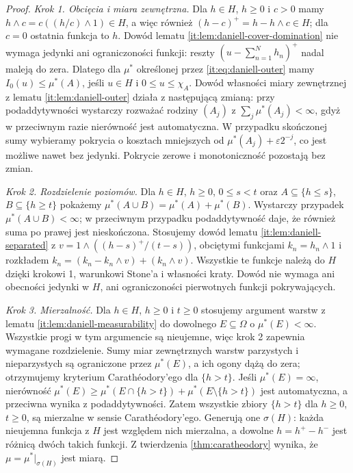 \begin{proof}
\emph{Krok 1. Obcięcia i miara zewnętrzna.}
Dla $h\in H$, $h\ge0$ i $c>0$ mamy
$h\wedge c=c((h/c)\wedge1)\in H$, a więc również
$(h-c)^+=h-h\wedge c\in H$; dla $c=0$ ostatnia
funkcja to $h$. Dowód lematu
\ref{it:lem:daniell-cover-domination} nie wymaga
jedynki ani ograniczoności funkcji: reszty
$(u-\sum_{n=1}^N h_n)^+$ nadal maleją do zera.
Dlatego dla $\mu^*$ określonej przez
\eqref{it:eq:daniell-outer} mamy
$I_0(u)\le\mu^*(A)$, jeśli $u\in H$ i
$0\le u\le\chi_A$.
Dowód własności miary zewnętrznej z lematu
\ref{it:lem:daniell-outer} działa z następującą
zmianą: przy podaddytywności wystarczy rozważać
rodziny $(A_j)$ z $\sum_j\mu^*(A_j)<\infty$,
gdyż w przeciwnym razie nierówność jest automatyczna.
W przypadku skończonej sumy wybieramy pokrycia
o kosztach mniejszych od $\mu^*(A_j)+\varepsilon2^{-j}$,
co jest możliwe nawet bez jedynki. Pokrycie zerowe
i monotoniczność pozostają bez zmian.

\emph{Krok 2. Rozdzielenie poziomów.}
Dla $h\in H$, $h\ge0$, $0\le s<t$ oraz
$A\subseteq\{h\le s\}$, $B\subseteq\{h\ge t\}$
pokażemy $\mu^*(A\cup B)=\mu^*(A)+\mu^*(B)$.
Wystarczy przypadek $\mu^*(A\cup B)<\infty$;
w przeciwnym przypadku podaddytywność daje,
że również suma po prawej jest nieskończona.
Stosujemy dowód lematu \ref{it:lem:daniell-separated}
z $v=1\wedge((h-s)^+/(t-s))$, obciętymi funkcjami
$k_n=h_n\wedge1$ i rozkładem
$k_n=(k_n-k_n\wedge v)+(k_n\wedge v)$.
Wszystkie te funkcje należą do $H$ dzięki krokowi 1,
warunkowi Stone'a i własności kraty. Dowód nie wymaga
ani obecności jedynki w $H$, ani ograniczoności
pierwotnych funkcji pokrywających.

\emph{Krok 3. Mierzalność.}
Dla $h\in H$, $h\ge0$ i $t\ge0$ stosujemy argument
warstw z lematu \ref{it:lem:daniell-measurability}
do dowolnego $E\subseteq\Omega$ o $\mu^*(E)<\infty$.
Wszystkie progi w tym argumencie są nieujemne,
więc krok 2 zapewnia wymagane rozdzielenie.
Sumy miar zewnętrznych warstw parzystych
i nieparzystych są ograniczone przez $\mu^*(E)$,
a ich ogony dążą do zera; otrzymujemy kryterium
Carathéodory'ego dla $\{h>t\}$.
Jeśli $\mu^*(E)=\infty$, nierówność
$\mu^*(E)\ge\mu^*(E\cap\{h>t\})+
\mu^*(E\setminus\{h>t\})$ jest automatyczna,
a przeciwna wynika z podaddytywności.
Zatem wszystkie zbiory $\{h>t\}$ dla $h\ge0$,
$t\ge0$, są mierzalne w sensie Carathéodory'ego.
Generują one $\sigma(H)$: każda nieujemna funkcja
z $H$ jest względem nich mierzalna, a dowolne
$h=h^+-h^-$ jest różnicą dwóch takich funkcji.
Z twierdzenia \ref{thm:caratheodory}
wynika, że $\mu=\mu^*|_{\sigma(H)}$ jest miarą.


\end{proof}
